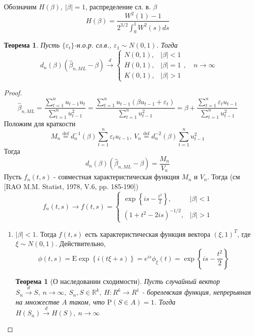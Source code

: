 \documentclass[12pt]{article}
\newtheorem{theorem}{Теорема}
\newtheorem*{theorem*}{Теорема}
\newcommand*{\defeq}{\stackrel{\text{def}}{=}}
\def\eps{ \varepsilon }
\def\R{ \mathbb{R} }
\def\E{ \mathrm{E} }
\def\P{ \mathrm{P} }
\begin{document}
Обозначим $H(\beta),\ \left\lvert \beta\right\rvert =1$, распределение сл. в. $\beta$
\[H(\beta)=\frac{W^2(1)-1}{2^{3/2}\int_0^1W^2(s)ds}\]
\begin{theorem}
    Пусть $\{\eps_t\}$-н.о.р. сл.в., $\eps_1\sim N(0,1)$. Тогда
    \[d_n(\beta)(\widehat{\beta}_{n,ML}-\beta)\xrightarrow{d}\begin{cases}
        N(0,1),& \left\lvert \beta\right\rvert <1 \\
        H(0,1),& \left\lvert \beta\right\rvert =1 \\
        K(0,1),& \left\lvert \beta\right\rvert >1 
    \end{cases}, \quad n\rightarrow\infty\]
\end{theorem}
\begin{proof}
    \[\widehat{\beta}_{n,ML}=\frac{\sum_{t=1}^nu_{t-1}u_t}{\sum_{t=1}^nu_{t-1}^2}=\frac{\sum_{t=1}^nu_{t-1}(\beta u_{t-1}+\eps_t)}{\sum_{t=1}^nu_{t-1}^2}=\beta+\frac{\sum_{t=1}^n\eps_tu_{t-1}}{\sum_{t=1}^nu_{t-1}^2}\]
    Положим для краткости
    \[M_n\defeq d^{-1}_n(\beta)\sum_{t=1}^n\eps_tu_{t-1},\ V_n\defeq d^{-2}_n(\beta)\sum_{t=1}^nu^2_{t-1}\]
    Тогда 
    \[d_n(\beta)(\widehat{\beta}_{n,ML}-\beta)=\frac{M_n}{V_n}\]
    Пусть $f_n(t,s)$ - совместная характеристическая функция $M_n$ и $V_n$.
    Тогда (см [RAO M.M. Statist, 1978, V.6, pp. 185-190])
    \begin{equation}\label{def::mutual_char_func}
        f_n(t,s)\rightarrow f(t,s)=\begin{cases}
            \exp{\left\{is-\frac{t^2}{2}\right\}},& \left\lvert \beta\right\rvert <1 \\
            (1+t^2-2is)^{-1/2},& \left\lvert \beta\right\rvert >1
        \end{cases}
    \end{equation}
    \begin{enumerate}
        \item \underline{$\left\lvert \beta\right\rvert <1$}. Тогда $f(t,s)$ есть характеристическая
        функция вектора $(\xi,1)^T$, где $\xi\sim N(0,1)$. Действительно,
        \[\phi(t,s)=\E\exp{\left\{i(t\xi+s)\right\}}=e^{is}\phi_\xi(t)=\exp{\left\{is-\frac{t^2}{2}\right\}}\]
        \begin{theorem*}[О наследовании сходимости]
            Пусть случайный вектор $S_n\xrightarrow{d}S,\ n\rightarrow\infty,\ S_n,S\in\R^k,\ H:R^k\rightarrow R^1$ - 
            борелевская функция, непрерывная на множестве $A$ таком, что $\P(S\in A)=1$. Тогда $H(S_n)\xrightarrow{d}H(S),\ n\rightarrow\infty$

\end{theorem*}
\end{enumerate}
\end{proof}
\end{document}
